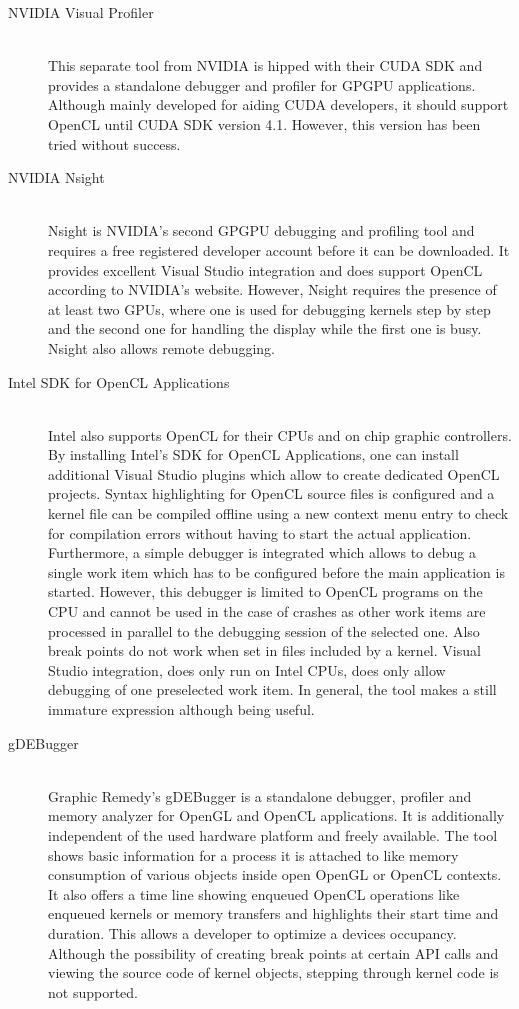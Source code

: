 \begin{description}
\item[NVIDIA Visual Profiler] \hfill \\
This separate tool from NVIDIA is hipped with their CUDA SDK and provides a standalone debugger and profiler for GPGPU applications. Although mainly developed for aiding CUDA developers, it should support OpenCL until CUDA SDK version 4.1. However, this version has been tried without success.

\item[NVIDIA Nsight] \hfill \\
Nsight is NVIDIA's second GPGPU debugging and profiling tool and requires a free registered developer account before it can be downloaded. It provides excellent Visual Studio integration and does support OpenCL according to NVIDIA's website. However, Nsight requires the presence of at least two GPUs, where one is used for debugging kernels step by step and the second one for handling the display while the first one is busy. Nsight also allows remote debugging.

\item[Intel SDK for OpenCL Applications] \hfill \\
Intel also supports OpenCL for their CPUs and on chip graphic controllers. By installing Intel's SDK for OpenCL Applications, one can install additional Visual Studio plugins which allow to create dedicated OpenCL projects. Syntax highlighting for OpenCL source files is configured and a kernel file can be compiled offline using a new context menu entry to check for compilation errors without having to start the actual application. Furthermore, a simple debugger is integrated which allows to debug a single work item which has to be configured before the main application is started. However, this debugger is limited to OpenCL programs on the CPU and cannot be used in the case of crashes as other work items are processed in parallel to the debugging session of the selected one. Also break points do not work when set in files included by a kernel. 
Visual Studio integration, does only run on Intel CPUs, does only allow debugging of one preselected work item. In general, the tool makes a still immature expression although being useful.

\item[gDEBugger] \hfill \\
Graphic Remedy's gDEBugger is a standalone debugger, profiler and memory analyzer for OpenGL and OpenCL applications. It is additionally independent of the used hardware platform and freely available. The tool shows basic information for a process it is attached to like memory consumption of various objects inside open OpenGL or OpenCL contexts. It also offers a time line showing enqueued OpenCL operations like enqueued kernels or memory transfers and highlights their start time and duration. This allows a developer to optimize a devices occupancy. Although the possibility of creating break points at certain API calls and viewing the source code of kernel objects, stepping through kernel code is not supported.


\end{description}

